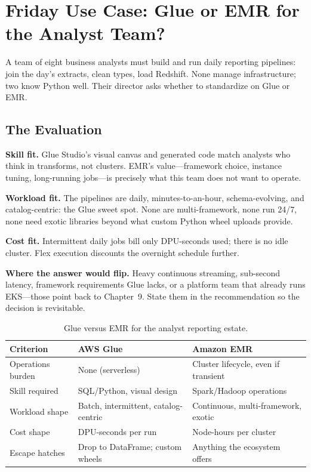 \section{Friday Use Case: Glue or EMR for the Analyst Team?}
A team of eight business analysts must build and run daily reporting pipelines: join the day's extracts, clean types, load Redshift. None manage infrastructure; two know Python well. Their director asks whether to standardize on Glue or EMR.

\subsection{The Evaluation}
\textbf{Skill fit.} Glue Studio's visual canvas and generated code match analysts who think in transforms, not clusters. EMR's value---framework choice, instance tuning, long-running jobs---is precisely what this team does not want to operate.

\textbf{Workload fit.} The pipelines are daily, minutes-to-an-hour, schema-evolving, and catalog-centric: the Glue sweet spot. None are multi-framework, none run 24/7, none need exotic libraries beyond what custom Python wheel uploads provide.

\textbf{Cost fit.} Intermittent daily jobs bill only DPU-seconds used; there is no idle cluster. Flex execution discounts the overnight schedule further.

\textbf{Where the answer would flip.} Heavy continuous streaming, sub-second latency, framework requirements Glue lacks, or a platform team that already runs EKS---those point back to Chapter~9. State them in the recommendation so the decision is revisitable.

\begin{table}[H]
\centering
\small
\begin{tabular}{@{}p{3.4cm}p{4.4cm}p{4.4cm}@{}}
\toprule
\textbf{Criterion} & \textbf{AWS Glue} & \textbf{Amazon EMR} \\
\midrule
Operations burden & None (serverless) & Cluster lifecycle, even if transient \\
Skill required & SQL/Python, visual design & Spark/Hadoop operations \\
Workload shape & Batch, intermittent, catalog-centric & Continuous, multi-framework, exotic \\
Cost shape & DPU-seconds per run & Node-hours per cluster \\
Escape hatches & Drop to DataFrame; custom wheels & Anything the ecosystem offers \\
\bottomrule
\end{tabular}
\caption{Glue versus EMR for the analyst reporting estate.}
\label{tab:ch10-glue-vs-emr}
\end{table}

